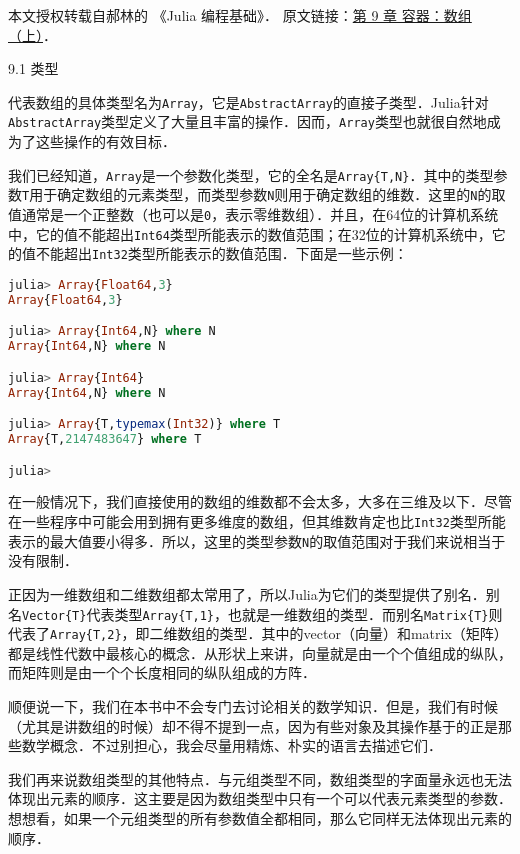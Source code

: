 
本文授权转载自郝林的 《Julia 编程基础》． 原文链接：\href{https://github.com/hyper0x/JuliaBasics/blob/master/book/ch09.md}{第 9 章 容器：数组（上）}．


9.1 类型

代表数组的具体类型名为\verb|Array|，它是\verb|AbstractArray|的直接子类型．Julia针对\verb|AbstractArray|类型定义了大量且丰富的操作．因而，\verb|Array|类型也就很自然地成为了这些操作的有效目标．

我们已经知道，\verb|Array|是一个参数化类型，它的全名是\verb|Array{T,N}|．其中的类型参数\verb|T|用于确定数组的元素类型，而类型参数\verb|N|则用于确定数组的维数．这里的\verb|N|的取值通常是一个正整数（也可以是\verb|0|，表示零维数组）．并且，在64位的计算机系统中，它的值不能超出\verb|Int64|类型所能表示的数值范围；在32位的计算机系统中，它的值不能超出\verb|Int32|类型所能表示的数值范围．下面是一些示例：

\begin{lstlisting}[language=julia]
julia> Array{Float64,3}
Array{Float64,3}

julia> Array{Int64,N} where N
Array{Int64,N} where N

julia> Array{Int64}
Array{Int64,N} where N

julia> Array{T,typemax(Int32)} where T
Array{T,2147483647} where T

julia> 
\end{lstlisting}

在一般情况下，我们直接使用的数组的维数都不会太多，大多在三维及以下．尽管在一些程序中可能会用到拥有更多维度的数组，但其维数肯定也比\verb|Int32|类型所能表示的最大值要小得多．所以，这里的类型参数\verb|N|的取值范围对于我们来说相当于没有限制．

正因为一维数组和二维数组都太常用了，所以Julia为它们的类型提供了别名．别名\verb|Vector{T}|代表类型\verb|Array{T,1}|，也就是一维数组的类型．而别名\verb|Matrix{T}|则代表了\verb|Array{T,2}|，即二维数组的类型．其中的vector（向量）和matrix（矩阵）都是线性代数中最核心的概念．从形状上来讲，向量就是由一个个值组成的纵队，而矩阵则是由一个个长度相同的纵队组成的方阵．

顺便说一下，我们在本书中不会专门去讨论相关的数学知识．但是，我们有时候（尤其是讲数组的时候）却不得不提到一点，因为有些对象及其操作基于的正是那些数学概念．不过别担心，我会尽量用精炼、朴实的语言去描述它们．

我们再来说数组类型的其他特点．与元组类型不同，数组类型的字面量永远也无法体现出元素的顺序．这主要是因为数组类型中只有一个可以代表元素类型的参数．想想看，如果一个元组类型的所有参数值全都相同，那么它同样无法体现出元素的顺序．


